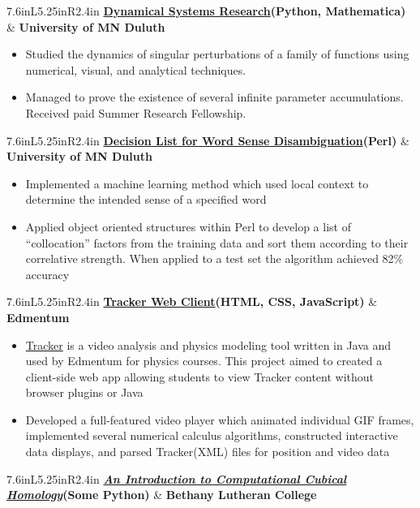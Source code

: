 \documentclass[letterpaper,10pt]{article}
\newcommand{\resitem}[1]{\item #1 

\vspace{-.1in}
}
\newcommand{\ressubheadingg}[2]{
	\begin{tabular*}{7.6in}{L{5.25in}R{2.4in}}
			\textbf{#1} & \textbf{#2}
	\end{tabular*}
}
\begin{document}
		\vspace{.1in}
		\ressubheadingg{\href{https://www.researchgate.net/publication/281248352_Infinite_Levels_of_Complexity_in_a_Family_of_One-Dimensional_Singular_Dynamical_Systems}{Dynamical Systems Research}(Python, Mathematica)}{University of MN Duluth}
			\vspace{-.25in}
			\begin{itemize}
				\resitem{Studied the dynamics of singular perturbations of a family of functions using numerical, visual, and analytical techniques.}
				\resitem{Managed to prove the existence of several infinite parameter accumulations. Received paid Summer Research Fellowship.}
			\end{itemize}
		\vspace{.1in}
		\ressubheadingg{\href{https://github.com/EvanOman/nlp-decision-list}{Decision List for Word Sense Disambiguation}(Perl)}{University of MN Duluth}
			\vspace{-.25in}
			\begin{itemize}
				\resitem{Implemented a machine learning method which used local context to determine the intended sense of a specified word}
				\resitem{Applied object oriented structures within Perl to develop a list of ``collocation'' factors from the training data and sort them according to their correlative strength. When applied to a test set the algorithm achieved 82\% accuracy}
			\end{itemize}
		\vspace{.1in}
		\ressubheadingg{\href{https://github.com/EvanOman/Tracker-Browser-Client}{Tracker Web Client}(HTML, CSS, JavaScript)}{Edmentum}
			\vspace{-.25in}
			\begin{itemize}
				\resitem{\href{https://www.cabrillo.edu/~dbrown/tracker/}{Tracker} is a video analysis and physics modeling tool written in Java and used by Edmentum for physics courses. This project aimed to created a client-side web app allowing students to view Tracker content without browser plugins or Java}
				\resitem{Developed a full-featured video player which animated individual GIF frames, implemented several numerical calculus algorithms, constructed interactive data displays, and parsed Tracker(XML) files for position and video data}
			\end{itemize}
		\vspace{.1in}
		\ressubheadingg{\href{https://drive.google.com/file/d/0B5IOv9SzzDlvdnowZVpKRzhXOU0/edit?usp=sharing}{\textit{An Introduction to Computational Cubical Homology}}(Some Python)}{Bethany Lutheran College}
\end{document}
